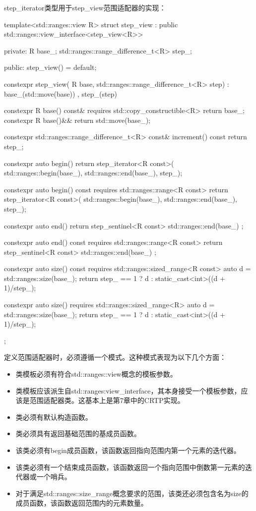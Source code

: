 step_iterator类型用于step_view范围适配器的实现：

\begin{cppcode}
template<std::ranges::view R>
struct step_view :
	public std::ranges::view_interface<step_view<R>>
{
private:
	R base_;
	std::ranges::range_difference_t<R> step_;
	
public:
	step_view() = default;
	
	constexpr step_view(
		R base,
		std::ranges::range_difference_t<R> step)
			: base_(std::move(base))
			, step_(step)
	{
	}

	constexpr R base() const&
		requires std::copy_constructible<R>
	{ return base_; }
	constexpr R base()&& { return std::move(base_); }
	
	constexpr std::ranges::range_difference_t<R> const&
	increment() const
	{ return step_; }
	
	constexpr auto begin()
	{
		return step_iterator<R const>(
			std::ranges::begin(base_),
			std::ranges::end(base_), step_);
	}

	constexpr auto begin() const
	requires std::ranges::range<R const>
	{
		return step_iterator<R const>(
			std::ranges::begin(base_),
			std::ranges::end(base_), step_);
	}

	constexpr auto end()
	{
		return step_sentinel<R const>{
			std::ranges::end(base_) };
	}

	constexpr auto end() const
	requires std::ranges::range<R const>
	{
		return step_sentinel<R const>{
			std::ranges::end(base_) };
	}

	constexpr auto size() const
	requires std::ranges::sized_range<R const>
	{
		auto d = std::ranges::size(base_);
		return step_ == 1 ? d :
			static_cast<int>((d + 1)/step_); 
	}
	
	constexpr auto size()
	requires std::ranges::sized_range<R>
	{
		auto d = std::ranges::size(base_);
		return step_ == 1 ? d :
			static_cast<int>((d + 1)/step_);
	}
};
\end{cppcode}

定义范围适配器时，必须遵循一个模式。这种模式表现为以下几个方面：

\begin{itemize}
  \item 类模板必须有符合std::ranges::view概念的模板参数。
  \item 类模板应该派生自std::ranges:view_interface，其本身接受一个模板参数，应该是范围适配器类。这基本上是第7章中的CRTP实现。
  \item 类必须有默认构造函数。
  \item 类必须具有返回基础范围的基成员函数。
  \item 该类必须有begin成员函数，该函数返回指向范围内第一个元素的迭代器。
  \item 该类必须有一个结束成员函数，该函数返回一个指向范围中倒数第一元素的迭代器或一个哨兵。
  \item 对于满足std::ranges::size_range概念要求的范围，该类还必须包含名为size的成员函数，该函数返回范围内的元素数量。
\end{itemize}

